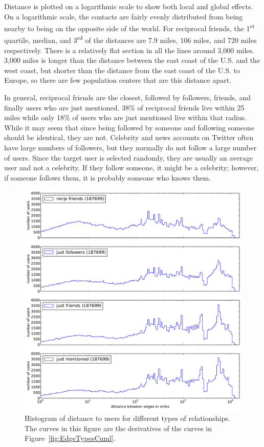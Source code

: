 \documentclass[letterpaper]{article}
\begin{document}
%
Distance is plotted on a logarithmic scale to show both local and
global effects.
%
On a logarithmic scale, the contacts are fairly evenly distributed from being
nearby to being on the opposite side of the world.
%
For reciprocal friends, the 1\textsuperscript{st} quartile, median, and
3\textsuperscript{rd} of the distances are 7.9 miles, 106 miles, and 720 miles
respectively.
%
There is a relatively flat section in all the lines around 3,000 miles.
%
3,000 miles is longer than the distance between the east coast of the U.S. and
the west coast, but shorter than the distance from the east coast of the U.S.
to Europe, so there are few population centers that are this distance apart.

In general, reciprocal friends are the closest, followed by followers, friends,
and finally users who are just mentioned.
%
38\% of reciprocal friends live within 25 miles while only 18\% of users
who are just mentioned live within that radius.
%
While it may seem that since being followed by someone and following someone
should be identical, they are not.
%
Celebrity and news accounts on Twitter often have large numbers of followers,
but they normally do not follow a large number of users.
%
Since the target user is selected randomly, they are usually an average
user and not a celebrity.
%
If they follow someone, it might be a celebrity; however, if someone follows
them, it is probably someone who knows them.

\begin{figure}[tbh]
\centering
\includegraphics[width=.9\linewidth]{figures/edge_types_norm.pdf}
\caption{
Histogram of distance to users for different types of relationships.
The curves in this figure are the derivatives of the curves in
Figure~\ref{fig:EdgeTypesCuml}.
}
\label{fig:EdgeTypes}
\end{figure}
\end{document}
